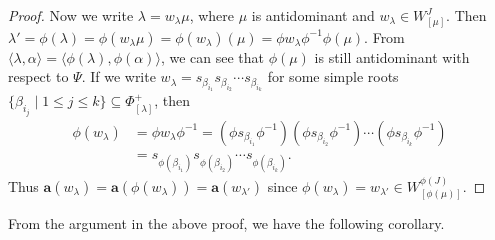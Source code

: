 \documentclass[reqno,12pt]{amsart}
\numberwithin{equation}{section}
\theoremstyle{plain}
\theoremstyle{definition}
\newcommand{\lam}{\lambda}
\renewcommand{\subset}{\subseteq}
\newcommand{\aff}{ \mathbf{a} }
\newcommand{\lest}{\leqslant}
\begin{document}
\begin{proof}
Now  we write $\lambda=w_{\lambda}\mu$, where $\mu$ is antidominant and $w_{\lambda}\in W_{[\mu]}^J$. Then $\lam'=\phi(\lam)=\phi(w_{\lambda}\mu)=\phi(w_{\lambda})(\mu)=\phi w_{\lambda}\phi ^{-1}\phi(\mu)$. From $\langle \lam, \alpha\rangle=\langle \phi(\lam),\phi(\alpha)\rangle$, we can see that $\phi(\mu)$ is still antidominant with respect to $\Psi$. If we write $w_{\lam}=s_{\beta_{i_1}}s_{\beta_{i_2}}\cdots s_{\beta_{i_k}}$ for some simple roots $\{\beta_{i_j}\mid 1\lest j\lest k\}\subset \Phi_{[\lam]}^+$, then \begin{align*}
   \phi(w_{\lam})&= \phi w_{\lam}\phi^{-1}=(\phi s_{\beta_{i_1}}\phi ^{-1})(\phi s_{\beta_{i_2}}\phi ^{-1})\cdots (\phi s_{\beta_{i_k}}\phi ^{-1})\\
    &=s_{\phi(\beta_{i_1})}s_{\phi(\beta_{i_2})}\cdots s_{\phi(\beta_{i_k})}.
\end{align*}
Thus $\aff(w_{\lam})=\aff(\phi(w_{\lam}))=\aff(w_{\lam'})$ since $\phi(w_{\lam})=w_{\lam'}\in W_{[\phi(\mu)]}^{\phi(J)}$.
\end{proof}

From the argument in the above proof, we have the following corollary.
\end{document}
